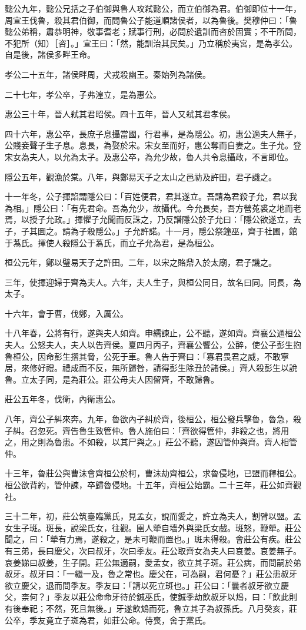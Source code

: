\begin{pinyinscope}
懿公九年，懿公兄括之子伯御與魯人攻弒懿公，而立伯御為君。伯御即位十一年，周宣王伐魯，殺其君伯御，而問魯公子能道順諸侯者，以為魯後。樊穆仲曰：「魯懿公弟稱，肅恭明神，敬事耆老；賦事行刑，必問於遺訓而咨於固實；不干所問，不犯所（知）［咨］。」宣王曰：「然，能訓治其民矣。」乃立稱於夷宮，是為孝公。自是後，諸侯多畔王命。

孝公二十五年，諸侯畔周，犬戎殺幽王。秦始列為諸侯。

二十七年，孝公卒，子弗湟立，是為惠公。

惠公三十年，晉人弒其君昭侯。四十五年，晉人又弒其君孝侯。

四十六年，惠公卒，長庶子息攝當國，行君事，是為隱公。初，惠公適夫人無子，公賤妾聲子生子息。息長，為娶於宋。宋女至而好，惠公奪而自妻之。生子允。登宋女為夫人，以允為太子。及惠公卒，為允少故，魯人共令息攝政，不言即位。

隱公五年，觀漁於棠。八年，與鄭易天子之太山之邑祊及許田，君子譏之。

十一年冬，公子揮諂謂隱公曰：「百姓便君，君其遂立。吾請為君殺子允，君以我為相。」隱公曰：「有先君命。吾為允少，故攝代。今允長矣，吾方營菟裘之地而老焉，以授子允政。」揮懼子允聞而反誅之，乃反譖隱公於子允曰：「隱公欲遂立，去子，子其圖之。請為子殺隱公。」子允許諾。十一月，隱公祭鐘巫，齊于社圃，館于蒍氏。揮使人殺隱公于蒍氏，而立子允為君，是為桓公。

桓公元年，鄭以璧易天子之許田。二年，以宋之賂鼎入於太廟，君子譏之。

三年，使揮迎婦于齊為夫人。六年，夫人生子，與桓公同日，故名曰同。同長，為太子。

十六年，會于曹，伐鄭，入厲公。

十八年春，公將有行，遂與夫人如齊。申繻諫止，公不聽，遂如齊。齊襄公通桓公夫人。公怒夫人，夫人以告齊侯。夏四月丙子，齊襄公饗公，公醉，使公子彭生抱魯桓公，因命彭生摺其脅，公死于車。魯人告于齊曰：「寡君畏君之威，不敢寧居，來修好禮。禮成而不反，無所歸咎，請得彭生除丑於諸侯。」齊人殺彭生以說魯。立太子同，是為莊公。莊公母夫人因留齊，不敢歸魯。

莊公五年冬，伐衛，內衛惠公。

八年，齊公子糾來奔。九年，魯欲內子糾於齊，後桓公，桓公發兵擊魯，魯急，殺子糾。召忽死。齊告魯生致管仲。魯人施伯曰：「齊欲得管仲，非殺之也，將用之，用之則為魯患。不如殺，以其尸與之。」莊公不聽，遂囚管仲與齊。齊人相管仲。

十三年，魯莊公與曹沬會齊桓公於柯，曹沬劫齊桓公，求魯侵地，已盟而釋桓公。桓公欲背約，管仲諫，卒歸魯侵地。十五年，齊桓公始霸。二十三年，莊公如齊觀社。

三十二年，初，莊公筑臺臨黨氏，見孟女，說而愛之，許立為夫人，割臂以盟。孟女生子斑。斑長，說梁氏女，往觀。圉人犖自墻外與梁氏女戲。斑怒，鞭犖。莊公聞之，曰：「犖有力焉，遂殺之，是未可鞭而置也。」斑未得殺。會莊公有疾。莊公有三弟，長曰慶父，次曰叔牙，次曰季友。莊公取齊女為夫人曰哀姜。哀姜無子。哀姜娣曰叔姜，生子開。莊公無適嗣，愛孟女，欲立其子斑。莊公病，而問嗣於弟叔牙。叔牙曰：「一繼一及，魯之常也。慶父在，可為嗣，君何憂？」莊公患叔牙欲立慶父，退而問季友。季友曰：「請以死立斑也。」莊公曰：「曩者叔牙欲立慶父，柰何？」季友以莊公命命牙待於鍼巫氏，使鍼季劫飲叔牙以鴆，曰：「飲此則有後奉祀；不然，死且無後。」牙遂飲鴆而死，魯立其子為叔孫氏。八月癸亥，莊公卒，季友竟立子斑為君，如莊公命。侍喪，舍于黨氏。


\end{pinyinscope}
